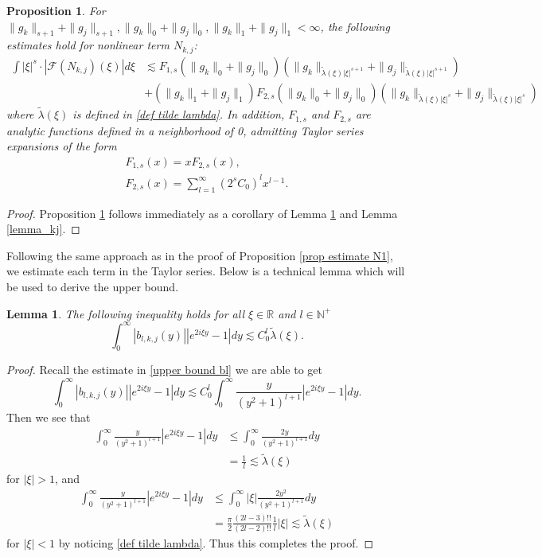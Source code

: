 \documentclass[11pt]{article}
\newcommand{\tla}{\tilde{\lambda}}
\newtheorem{proposition}{Proposition}[section]
\newtheorem{lemma}{Lemma}[section]
\theoremstyle{definition}
\numberwithin{equation}{section}
\begin{document}
\begin{proposition}\label{prop nonlinear kj}
    For $\|g_k\|_{s+1}+\|g_j\|_{s+1},\|g_k\|_0+\|g_j\|_0,\|g_k\|_1+\|g_j\|_1<\infty$, the following estimates hold for nonlinear term $N_{k,j}$:
    \begin{align}
        \int|\xi|^s\cdot|\mathscr{F}(N_{k,j})(\xi)|d\xi&\lesssim F_{1,s}(\|g_k\|_0+\|g_j\|_0)\left(\|g_k\|_{\tla(\xi)|\xi|^{s+1}}+\|g_j\|_{\tla(\xi)|\xi|^{s+1}}\right)\\
            &+(\|g_k\|_1+\|g_j\|_1)F_{2,s}(\|g_k\|_0+\|g_j\|_0)\left(\|g_k\|_{\tla(\xi)|\xi|^{s}}+\|g_j\|_{\tla(\xi)|\xi|^{s}}\right)
    \end{align}
    where $\tla(\xi)$ is defined in \eqref{def tilde lambda}. In addition, $F_{1,s}$ and $F_{2,s}$ are analytic functions defined in a neighborhood of 0, admitting Taylor series expansions of the form
    \begin{gather}
        F_{1,s}(x)=xF_{2,s}(x),\\
        F_{2,s}(x)=\sum_{l=1}^{\infty}(2^sC_0)^lx^{l-1}.
    \end{gather}
\end{proposition}
\begin{proof}
    Proposition \ref{prop nonlinear kj} follows immediately as a corollary of Lemma \ref{lemma_technique_kj} and Lemma \ref{lemma_kj}.
\end{proof}
Following the same approach as in the proof of Proposition \ref{prop estimate N1}, we estimate each term in the Taylor series. Below is a technical lemma which will be used to derive the upper bound.
\begin{lemma}\label{lemma_technique_kj}
    The following inequality holds for all $\xi\in\mathbb{R}$ and $l\in\mathbb{N}^+$
    \begin{equation}
        \int_0^{\infty}|b_{l,k,j}(y)||e^{2i\xi y}-1|dy
\lesssim C_0^l\tla(\xi).
    \end{equation}
\end{lemma}
\begin{proof}
    Recall the estimate in  \eqref{upper bound bl} we are able to get
    \begin{equation}
        \int_0^{\infty}|b_{l,k,j}(y)||e^{2i\xi y}-1|dy\lesssim C_0^l\int_0^{\infty}\frac{y}{(y^2+1)^{l+1}}|e^{2i\xi y}-1|dy.
    \end{equation}
Then we see that
\begin{align*}
    \int_0^{\infty}\frac{y}{(y^2+1)^{l+1}}|e^{2i\xi y}-1|dy&\leq \int_0^{\infty}\frac{2y}{(y^2+1)^{l+1}}dy\\
    &=\frac{1}{l}\lesssim\tla(\xi)
\end{align*}
for $|\xi|>1$, and
\begin{align*}
    \int_0^{\infty}\frac{y}{(y^2+1)^{l+1}}|e^{2i\xi y}-1|dy&\leq\int_0^{\infty}|\xi|\frac{2y^2}{(y^2+1)^{l+1}}dy\\
    &=\frac{\pi}{2}\frac{(2l-3)!!}{(2l-2)!!}\frac{1}{l}|\xi|\lesssim \tla(\xi)
\end{align*}
for $|\xi|<1$ by noticing \eqref{def tilde lambda}. Thus this completes the proof.
\end{proof}
\end{document}
